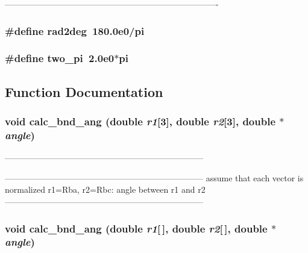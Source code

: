 ---------------------------------------------------------------------------- 
\subsubsection{\setlength{\rightskip}{0pt plus 5cm}\#define rad2deg~180.0e0/pi}\label{PTripepClosure_8h_d0dfcdf5be10330f25162e018afca97e}


\subsubsection{\setlength{\rightskip}{0pt plus 5cm}\#define two\_\-pi~2.0e0$\ast$pi}\label{PTripepClosure_8h_ca29ec85c5cbb1c5b525fc762158d42e}




\subsection{Function Documentation}
\subsubsection{\setlength{\rightskip}{0pt plus 5cm}void calc\_\-bnd\_\-ang (double {\em r1}[3], double {\em r2}[3], double $\ast$ {\em angle})}\label{PTripepClosure_8h_e0e2bb6a9c4850ae034b55db08ef17fb}


----------------------------------------------------------------------- 



----------------------------------------------------------------------- assume that each vector is normalized r1=Rba, r2=Rbc: angle between r1 and r2 ----------------------------------------------------------------------- 
\subsubsection{\setlength{\rightskip}{0pt plus 5cm}void calc\_\-bnd\_\-ang (double {\em r1}[$\,$], double {\em r2}[$\,$], double $\ast$ {\em angle})}\label{PTripepClosure_8h_8d15e4f753f71a982803ba85d400334e}


